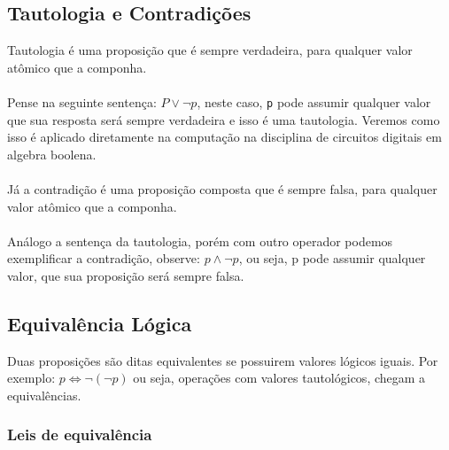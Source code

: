 \documentclass[12pt, onecolumn]{article}
\begin{document}
		\subsection{Tautologia e Contradições}
	Tautologia é uma proposição que é sempre verdadeira, para qualquer valor
	atômico que a componha.\\
	\\
	Pense na seguinte sentença: $P \lor \lnot p$, neste caso, \texttt{p}
	pode assumir qualquer valor que sua resposta será sempre verdadeira e
	isso é uma tautologia. Veremos como isso é aplicado diretamente na
	computação na disciplina de circuitos digitais em algebra boolena.\\
	\\
	Já a contradição é uma proposição composta que é sempre falsa, para
	qualquer valor atômico que a componha.\\
	\\
	Análogo a sentença da tautologia, porém com outro operador podemos
	exemplificar a contradição, observe: $p \land \lnot p$, ou seja, 
	p pode assumir qualquer valor, que sua proposição será sempre falsa.
	
		\subsection{Equivalência Lógica}
	Duas proposições são ditas equivalentes se possuirem valores lógicos iguais.
	Por exemplo: $p \Longleftrightarrow \lnot(\lnot p)$ ou seja, operações
	com valores tautológicos, chegam a equivalências.\\
		
		\subsubsection{Leis de equivalência}
	
\end{document}
